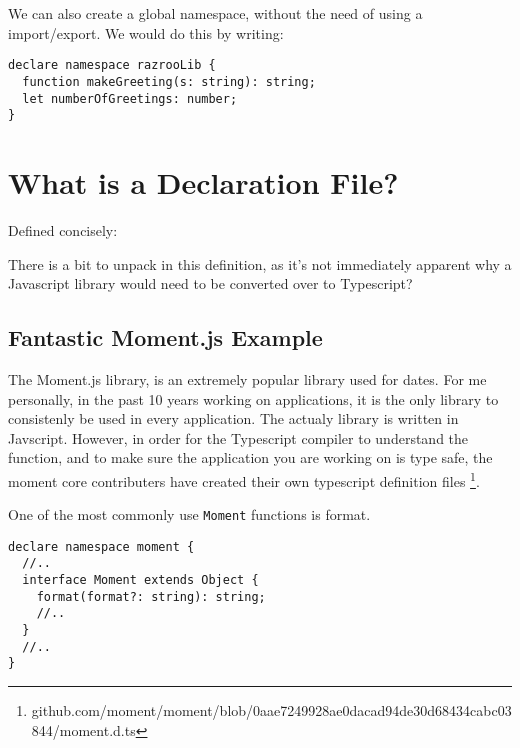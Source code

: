 We can also create a global namespace, without the need of using a import/export. We would do this by writing: 
\begin{verbatim}
declare namespace razrooLib {
  function makeGreeting(s: string): string;
  let numberOfGreetings: number;
}
\end{verbatim}

\section{What is a Declaration File?}
Defined concisely: 
\begin{quote}
\end{quote}

There is a bit to unpack in this definition, as it's not immediately apparent why a Javascript library would need to be converted over to Typescript? 

\subsection{Fantastic Moment.js Example }
The Moment.js library, is an extremely popular library used for dates. For me personally, in the past 10 years working on applications, it is the only library to consistenly be used in every application. The actualy library is written in Javscript. However, in order for the Typescript compiler to understand the function, and to make sure the application you are working on is type safe, the moment core contributers have created their own typescript definition files \footnote{github.com/moment/moment/blob/0aae7249928ae0dacad94de30d68434cabc03844/moment.d.ts}.  

One of the most commonly use \lstinline{Moment} functions is format.
\begin{lstlisting}[caption=moment.d.ts]
declare namespace moment {
  //..
  interface Moment extends Object {
    format(format?: string): string;
    //..
  }
  //..
}
\end{lstlisting}

